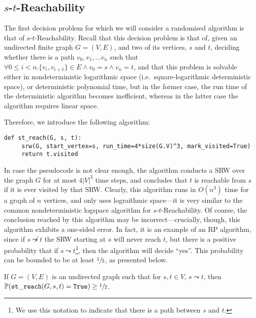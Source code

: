 	\subsection{$s$-$t$-Reachability}
	The first decision problem for which we will consider a randomised algorithm is that of 
	$s$-$t$-Reachability. Recall that this decision problem is that of, given an undirected 
	finite graph $G =(V,E)$, and two of its vertices, $s$ and $t$, deciding whether there is a 
	path $v_0, v_1, \hdots v_n$ such that $\forall 0 \leq i < n. \{v_i , v_{i+1}\} \in E \land
	v_0 = s \land v_n = t$, and that this problem is solvable either in nondeterministic 
	logarithmic space (i.e.\ square-logarithmic deterministic space), or deterministic 
	polynomial time, but in the former case, the run time of the deterministic algorithm 
	becomes inefficient, whereas in the latter case the algorithm requires linear space. 
	\par
	Therefore, we introduce the following algorithm:
	\begin{lstlisting}[label=listing:streach, caption={Randomised $s$-$t$-Reachability},
	style=mystyle]
def st_reach(G, s, t):
     srw(G, start_vertex=s, run_time=4*size(G.V)^3, mark_visited=True)
     return t.visited
	\end{lstlisting}
	In case the pseudocode is not clear enough, the algorithm conducts a SRW over the graph $G$
	for at most $4|V|^3$ time steps, and concludes that $t$ is reachable from $s$ if it is 
	ever visited by that SRW. Clearly, this algorithm runs in $O(n^3)$ time for a graph of $n$ 
	vertices, and only uses lograithmic space---it is very similar to the common 
	nondeterministic logspace algorithm for $s$-$t$-Reachability. Of course,  the conclusion 
	reached by this algorithm may be incorrect---crucially, though, this algorithm exhibits a 
	one-sided error. In fact, it is an example of an RP algorithm, since if $s \not\leadsto t
	$ the SRW starting at $s$ will never reach $t$, but there is a positive probability that 
	if $s \leadsto t$\footnote{We use this notation to indicate that there is a path between $
	s$ and $t$.}, then the algorithm will decide ``yes''. This probability can be bounded to 
	be at least $\sfrac{1}{2}$, as presented below.
	\begin{lemma}
		\label{lemma:srwreachampl}
		If $G = (V, E)$ is an undirected graph such that for $s, t \in V$, $s \leadsto t$,
		then $\mathbb{P}(\mathtt{st\_reach}(G, s, t) = \mathtt{True}) \geq \sfrac{1}{2}$.
	\end{lemma}
